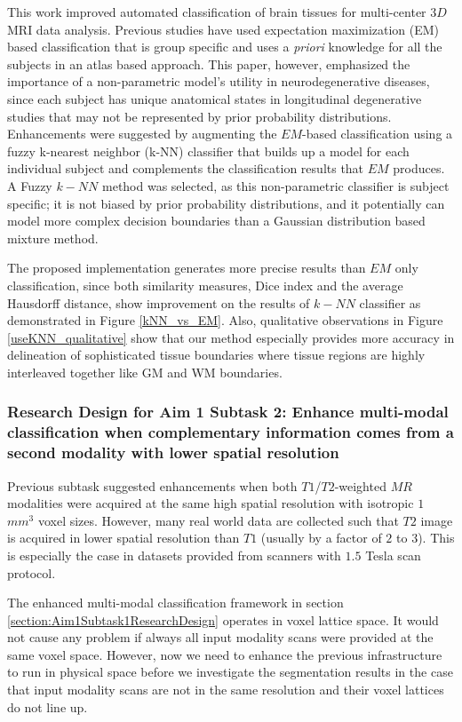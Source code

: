 This work improved automated classification of brain tissues for multi-center $3D$ MRI data analysis. Previous studies have used expectation maximization (EM) based classification that is group specific and uses a \emph{priori} knowledge for all the subjects in an atlas based approach.
This paper, however, emphasized the importance of a non-parametric model's utility in neurodegenerative diseases, since each subject has unique anatomical states in longitudinal degenerative studies that may not be represented by prior probability distributions. Enhancements were suggested by augmenting the $EM$-based classification using a fuzzy k-nearest neighbor (k-NN) classifier that builds up a model for each individual subject and complements the classification results that $EM$ produces.
A Fuzzy $k-NN$ method was selected, as this non-parametric classifier is subject specific; it is not biased by prior probability distributions, and it potentially can model more complex decision boundaries than a Gaussian distribution based mixture method.

The proposed implementation generates more precise results than $EM$ only classification, since both similarity measures, Dice index and the average Hausdorff distance, show improvement on the results of $k-NN$ classifier as demonstrated in Figure \ref{kNN_vs_EM}.
Also, qualitative observations in Figure \ref{useKNN_qualitative} show that our method especially provides more accuracy in delineation of sophisticated tissue boundaries where tissue regions are highly interleaved together like GM and WM boundaries.
\newline

\subsubsection{Research Design for Aim 1 Subtask 2: Enhance multi-modal classification when complementary information comes from a second modality with lower spatial resolution}
\label{section:Aim1Subtask2ResearchDesign} %

Previous subtask suggested enhancements when both $T1$/$T2$-weighted $MR$ modalities were acquired at the same high spatial resolution with isotropic $1$ $mm^{3}$ voxel sizes. However, many real world data are collected such that $T2$ image is acquired in lower spatial resolution than $T1$ (usually by a factor of $2$ to $3$). This is especially the case in datasets provided from scanners with $1.5$ Tesla scan protocol.

The enhanced multi-modal classification framework in section \ref{section:Aim1Subtask1ResearchDesign} operates in voxel lattice space. It would not cause any problem if always all input modality scans were provided at the same voxel space. However, now we need to enhance the previous infrastructure to run in physical space before we investigate the segmentation results in the case that input modality scans are not in the same resolution and their voxel lattices do not line up.

